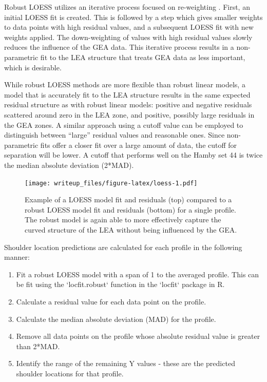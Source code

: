 \documentclass[]{article}
\begin{document}
Robust LOESS utilizes an iterative process focused on re-weighting
\citep[see][]{Cleveland1}. First, an initial LOESS fit is created. This
is followed by a step which gives smaller weights to data points with
high residual values, and a subsequent LOESS fit with new weights
applied. The down-weighting of values with high residual values slowly
reduces the influence of the GEA data. This iterative process results in
a non-parametric fit to the LEA structure that treats GEA data as less
important, which is desirable.

While robust LOESS methods are more flexible than robust linear models,
a model that is accurately fit to the LEA structure results in the same
expected residual structure as with robust linear models: positive and
negative residuals scattered around zero in the LEA zone, and positive,
possibly large residuals in the GEA zones. A similar approach using a
cutoff value can be employed to distinguish between ``large'' residual
values and reasonable ones. Since non-parametric fits offer a closer fit
over a large amount of data, the cutoff for separation will be lower. A
cutoff that performs well on the Hamby set 44 is twice the median
absolute deviation (2*MAD).

\begin{figure}
\centering
\texttt{[image: writeup\_files/figure-latex/loess-1.pdf]}
\caption{\label{loess}Example of a LOESS model fit and residuals (top)
compared to a robust LOESS model fit and residuals (bottom) for a single
profile. The robust model is again able to more effectively capture the
curved structure of the LEA without being influenced by the GEA.}
\end{figure}

Shoulder location predictions are calculated for each profile in the
following manner:

\begin{enumerate}
\item Fit a robust LOESS model with a span of 1 to the averaged profile. This can be fit using the `locfit.robust` function in the `locfit` package in R.
\item Calculate a residual value for each data point on the profile.  
\item Calculate the median absolute deviation (MAD) for the profile.  
\item Remove all data points on the profile whose absolute residual value is greater than 2*MAD.  
\item Identify the range of the remaining Y values - these are the predicted shoulder locations for that profile.   
\end{enumerate}
\end{document}
